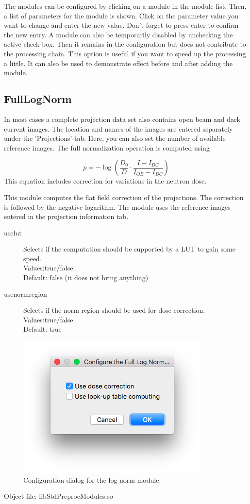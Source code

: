 \documentclass[a4paper]{scrreprt}
\begin{document}
The modules can be configured by clicking on a module in the module list. Then, a list of parameters for the module is shown. Click on the parameter value you want to change and enter the new value. Don't forget to press enter to confirm
the new entry. A module can also be temporarily disabled by unchecking the active check-box. Then it remains in the configuration but does not contribute to the processing chain. This option is useful if you want to speed up the processing a little. It can also be used to demonstrate effect before and after adding the module.

\subsection{FullLogNorm}
In most cases a complete projection data set also contains open beam and dark current images. The location and names of the images are entered separately under the 'Projections'-tab. Here, you can also set the number of available reference images. The full normalization operation is computed using

\begin{equation}
p=-\log\left(\frac{D_0}{D}\cdot\frac{I-I_{DC}}{I_{OB}-I_{DC}}\right)
\end{equation}
This equation includes correction for variations in the neutron dose.

This module computes the flat field correction of the projections. The correction is followed by the negative logarithm. The module uses the reference images entered in the projection information tab.
\begin{description}
 \item[uselut] Selects if the computation should be supported by a LUT to gain some speed. \\Values:true/false.\\Default: false (it does not bring anything)
\item[usenormregion] Selects if the norm region should be used for dose correction. \\Values:true/false.\\Default: true
\end{description}
\begin{figure}[ht!]
\centering
\includegraphics[scale=0.5]{figures3/Module_LogNorm.png}
\caption{Configuration dialog for the log norm module.}
\end{figure}
Object file: libStdPreprocModules.so
\end{document}
